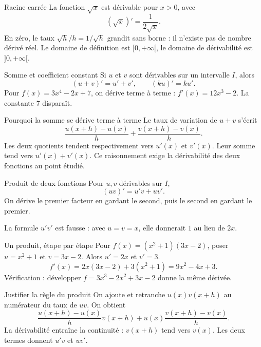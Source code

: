 \documentclass[aspectratio=169,12pt]{beamer}
\begin{document}
\renewcommand{\slidekind}{COMPRENDRE}
\begin{frame}[t,fragile]{Racine carrée}
La fonction $\sqrt{x}$ est dérivable pour $x>0$, avec\[(\sqrt{x})\prime=\frac1{2\sqrt{x}}.\] En zéro, le taux $\sqrt{h}/h=1/\sqrt{h}$ grandit sans borne : il n’existe pas de nombre dérivé réel. Le domaine de définition est $[0,+\infty[$, le domaine de dérivabilité est $]0,+\infty[$.
\end{frame}
\renewcommand{\slidekind}{COMPRENDRE}
\begin{frame}[t,fragile]{Somme et coefficient constant}
Si $u$ et $v$ sont dérivables sur un intervalle $I$, alors\[(u+v)\prime=u\prime+v\prime,\qquad(ku)\prime=ku\prime.\] Pour $f(x)=3x^4-2x+7$, on dérive terme à terme : $f\prime(x)=12x^3-2$. La constante $7$ disparaît.
\end{frame}
\renewcommand{\slidekind}{JUSTIFIER}
\begin{frame}[t,fragile]{Pourquoi la somme se dérive terme à terme}
Le taux de variation de $u+v$ s’écrit\[\frac{u(x+h)-u(x)}h+\frac{v(x+h)-v(x)}h.\] Les deux quotients tendent respectivement vers $u\prime(x)$ et $v\prime(x)$. Leur somme tend vers $u\prime(x)+v\prime(x)$. Ce raisonnement exige la dérivabilité des deux fonctions au point étudié.
\end{frame}
\renewcommand{\slidekind}{COMPRENDRE}
\begin{frame}[t,fragile]{Produit de deux fonctions}
Pour $u,v$ dérivables sur $I$,\[(uv)\prime=u\prime v+uv\prime.\] On dérive le premier facteur en gardant le second, puis le second en gardant le premier.\medskip\par La formule $u\prime v\prime$ est fausse : avec $u=v=x$, elle donnerait $1$ au lieu de $2x$.
\end{frame}
\renewcommand{\slidekind}{MÉTHODE \& EXEMPLE}
\begin{frame}[t,fragile]{Un produit, étape par étape}
Pour $f(x)=(x^2+1)(3x-2)$, poser $u=x^2+1$ et $v=3x-2$. Alors $u\prime=2x$ et $v\prime=3$.\[f\prime(x)=2x(3x-2)+3(x^2+1)=9x^2-4x+3.\] Vérification : développer $f=3x^3-2x^2+3x-2$ donne la même dérivée.
\end{frame}
\renewcommand{\slidekind}{JUSTIFIER}
\begin{frame}[t,fragile]{Justifier la règle du produit}
On ajoute et retranche $u(x)v(x+h)$ au numérateur du taux de $uv$. On obtient\[\frac{u(x+h)-u(x)}h v(x+h)+u(x)\frac{v(x+h)-v(x)}h.\] La dérivabilité entraîne la continuité : $v(x+h)$ tend vers $v(x)$. Les deux termes donnent $u\prime v$ et $uv\prime$.
\end{frame}
\end{document}
